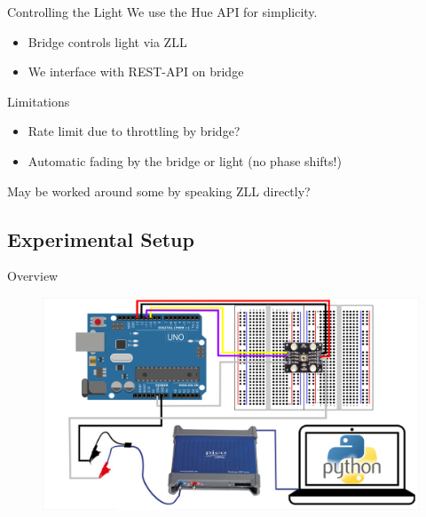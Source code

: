 \documentclass[11pt,t,usepdftitle=false,aspectratio=169]{beamer}
\begin{document}
\begin{frame}{Controlling the Light}
	We use the Hue API for simplicity.
	\begin{itemize}
		\item Bridge controls light via ZLL
		\item We interface with REST-API on bridge
	\end{itemize}

	\pause
	\begin{block}{Limitations}
		\begin{itemize}
			\item Rate limit due to throttling by bridge?
			\item Automatic fading by the bridge or light (no phase shifts!)
		\end{itemize}
		May be worked around some by speaking ZLL directly?
	\end{block}
\end{frame}

\subsection{Experimental Setup}%
\label{sub:experimental_setup}

\begin{frame}{Overview}
	\begin{figure}
		\centering
		\includegraphics{img/experimental-setup_overview.png}
	\end{figure}
\end{frame}
\end{document}
